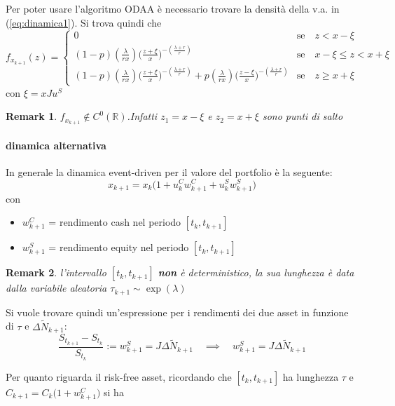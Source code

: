 \documentclass[12pt,a4paper]{article}
\theoremstyle{break}
\newtheorem{remark}{Remark}
\begin{document}
Per poter usare l'algoritmo ODAA è necessario trovare la densità della v.a. in (\ref{eq:dinamica1}). Si trova quindi che 
\begin{equation}
f_{x_{k+1}}(z) = 
\begin{cases}
0 & \text{se} \quad z < x - \xi\\
(1-p)(\frac{\lambda}{r x})\Big(\frac{z+\xi}{x}\Big)^{-(\frac{\lambda+r}{r})} & \text{se} \quad x-\xi \leq z < x + \xi \\
(1-p)(\frac{\lambda}{r x})\Big(\frac{z+\xi}{x}\Big)^{-(\frac{\lambda+r}{r})} + p(\frac{\lambda}{r x})\Big(\frac{z-\xi}{x}\Big)^{-(\frac{\lambda+r}{r})} & \text{se} \quad z \geq x + \xi
\end{cases}
\end{equation}
con $ \xi = xJu^S$

\begin{remark}
	$f_{x_{k+1}} \notin C^0(\mathbb{R})$.Infatti  $z_1 = x - \xi$ e $z_2 = x + \xi$ sono punti di salto
\end{remark}

\paragraph{dinamica alternativa}
In generale la dinamica event-driven per il valore del portfolio è la seguente:
\begin{equation}
	x_{k+1} = x_k\Big( 1 + u^C_k w^C_{k+1} + u^S_k w^S_{k+1}\Big)
\end{equation}
con 
\begin{itemize}
	\item $w^C_{k+1}$ = rendimento cash nel periodo $[t_k,t_{k+1}]$
	\item $w^S_{k+1}$ = rendimento equity nel periodo $[t_k,t_{k+1}]$
\end{itemize}

\vspace*{0.5cm}
\begin{remark}
	l'intervallo $[t_k,t_{k+1}]$ \textbf{non} è deterministico, la sua lunghezza è data dalla variabile aleatoria $\tau_{k+1} \sim \exp(\lambda)$
\end{remark}
\vspace*{0.5cm}
Si vuole trovare quindi un'espressione per i rendimenti dei due asset in funzione di $\tau$ e $\Delta \widetilde{N}_{k+1}$:
\[
\frac{S_{t_{k+1}} - S_{t_{k}}}{S_{t_{k}}} := w^S_{k+1} = J\Delta \widetilde{N}_{k+1} \quad \implies \quad \boxed{w^S_{k+1} = J\Delta \widetilde{N}_{k+1}} 
\]

Per quanto riguarda il risk-free asset, ricordando che $[t_k,t_{k+1}]$ ha lunghezza $\tau$ e $C_{k+1} = C_k\big(1 + w^C_{k+1} \big)$ si ha
\end{document}
